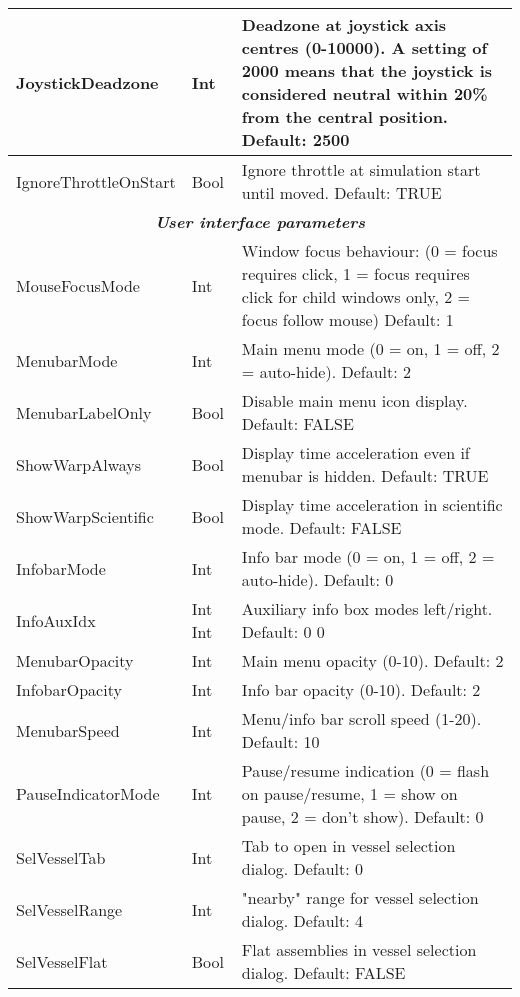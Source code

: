 \documentclass[Orbiter User Manual.tex]{subfiles}
\begin{document}
\begin{longtable}{ |p{}|p{}|p{}| }
	\hline\rule{0pt}{2ex}
	JoystickDeadzone & Int & Deadzone at joystick axis centres (0-10000). A setting of 2000 means that the joystick is considered neutral within 20\% from the central position. Default: 2500\\
	\hline\rule{0pt}{2ex}
	IgnoreThrottleOnStart & Bool & Ignore throttle at simulation start until moved. Default: TRUE\\
	\hline
	\multicolumn{3}{|c|}{\rule{0pt}{2ex}\textbf{\textit{User interface parameters}}}\\
	\hline\rule{0pt}{2ex}
	MouseFocusMode & Int & Window focus behaviour: (0 = focus requires click, 1 = focus requires click for child windows only, 2 = focus follow mouse) Default: 1\\
	\hline\rule{0pt}{2ex}
	MenubarMode & Int & Main menu mode (0 = on, 1 = off, 2 = auto-hide). Default: 2\\
	\hline\rule{0pt}{2ex}
	MenubarLabelOnly & Bool & Disable main menu icon display. Default: FALSE\\
	\hline\rule{0pt}{2ex}
	ShowWarpAlways & Bool & Display time acceleration even if menubar is hidden. Default: TRUE\\
	\hline\rule{0pt}{2ex}
	ShowWarpScientific & Bool & Display time acceleration in scientific mode. Default: FALSE\\
	\hline\rule{0pt}{2ex}
	InfobarMode & Int & Info bar mode (0 = on, 1 = off, 2 = auto-hide). Default: 0\\
	\hline\rule{0pt}{2ex}
	InfoAuxIdx & Int Int & Auxiliary info box modes left/right. Default: 0 0\\
	\hline\rule{0pt}{2ex}
	MenubarOpacity & Int & Main menu opacity (0-10). Default: 2\\
	\hline\rule{0pt}{2ex}
	InfobarOpacity & Int & Info bar opacity (0-10). Default: 2\\
	\hline\rule{0pt}{2ex}
	MenubarSpeed & Int & Menu/info bar scroll speed (1-20). Default: 10\\
	\hline\rule{0pt}{2ex}
	PauseIndicatorMode & Int & Pause/resume indication (0 = flash on pause/resume, 1 = show on pause, 2 = don't show). Default: 0\\
	\hline\rule{0pt}{2ex}
	SelVesselTab & Int & Tab to open in vessel selection dialog. Default: 0\\
	\hline\rule{0pt}{2ex}
	SelVesselRange & Int & "nearby" range for vessel selection dialog. Default: 4\\
	\hline\rule{0pt}{2ex}
	SelVesselFlat & Bool & Flat assemblies in vessel selection dialog. Default: FALSE\\

\end{longtable}
\end{document}
